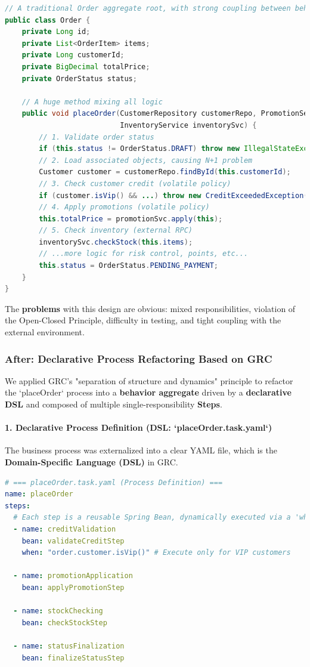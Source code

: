 \documentclass[11pt]{article}
\begin{document}
\begin{lstlisting}[language=Java, caption={A traditional Order aggregate root with strong coupling}]
// A traditional Order aggregate root, with strong coupling between behavior and data
public class Order {
    private Long id;
    private List<OrderItem> items;
    private Long customerId;
    private BigDecimal totalPrice;
    private OrderStatus status;

    // A huge method mixing all logic
    public void placeOrder(CustomerRepository customerRepo, PromotionService promotionSvc, 
                           InventoryService inventorySvc) {
        // 1. Validate order status
        if (this.status != OrderStatus.DRAFT) throw new IllegalStateException(...);
        // 2. Load associated objects, causing N+1 problem
        Customer customer = customerRepo.findById(this.customerId);
        // 3. Check customer credit (volatile policy)
        if (customer.isVip() && ...) throw new CreditExceededException(...);
        // 4. Apply promotions (volatile policy)
        this.totalPrice = promotionSvc.apply(this);
        // 5. Check inventory (external RPC)
        inventorySvc.checkStock(this.items);
        // ...more logic for risk control, points, etc...
        this.status = OrderStatus.PENDING_PAYMENT;
    }
}
\end{lstlisting}
The \textbf{problems} with this design are obvious: mixed responsibilities, violation of the Open-Closed Principle, difficulty in testing, and tight coupling with the external environment.

\subsubsection*{After: Declarative Process Refactoring Based on GRC}

We applied GRC's "separation of structure and dynamics" principle to refactor the `placeOrder` process into a \textbf{behavior aggregate} driven by a \textbf{declarative DSL} and composed of multiple single-responsibility \textbf{Steps}.

\paragraph{1. Declarative Process Definition (DSL: `placeOrder.task.yaml`)}
The business process was externalized into a clear YAML file, which is the \textbf{Domain-Specific Language (DSL)} in GRC.
\begin{lstlisting}[language=YAML, caption={Declarative Process Definition (placeOrder.task.yaml)}]
# === placeOrder.task.yaml (Process Definition) ===
name: placeOrder
steps:
  # Each step is a reusable Spring Bean, dynamically executed via a 'when' condition
  - name: creditValidation
    bean: validateCreditStep
    when: "order.customer.isVip()" # Execute only for VIP customers

  - name: promotionApplication
    bean: applyPromotionStep

  - name: stockChecking
    bean: checkStockStep

  - name: statusFinalization
    bean: finalizeStatusStep
\end{lstlisting}
\end{document}
